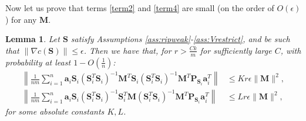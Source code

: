 \documentclass[twoside,11pt]{article}
\newtheorem{lem}{Lemma}
\begin{document}
Now let us prove that terms  \ref{term2} and  \ref{term4} are small (on the order of $O(\epsilon)$) for any $\bm{M}$.

\begin{lem}
	\label{lem:term_24_bound}
	Let $\bm{S}$ satisfy Assumptions \ref{ass:ripweak}-\ref{ass:Vrestrict}, and be such that $\|\nabla c(\bm{S})\|\leq \epsilon$. Then we have that, for $r>\frac{Ck}{m}$ for sufficiently large $C$, with probability at least $1-O(\frac{1}{n})$:
	\begin{align*}
	\left\|\frac{1}{nm}\sum_{i=1}^n\bm{a}_i\bm{S}_i(\bm{S}_i^T\bm{S}_i)^{-1}\bm{M}^T\bm{S}_i(\bm{S}_i^T\bm{S}_i)^{-1}\bm{M}^T\bm{P}_{\bm{S}_i}\bm{a}_i^T\right\|&\leq Kr\epsilon\|\bm{M}\|^2,\\
	\left\|\frac{1}{nm}\sum_{i=1}^n\bm{a}_i\bm{S}_i(\bm{S}_i^T\bm{S}_i)^{-1} \bm{S}^T_i\bm{M}(\bm{S}_i^T\bm{S}_i)^{-1}\bm{M}^T \bm{P}_{\bm{S}_i}\bm{a}_i^T\right\|&\leq Lr\epsilon\|\bm{M}\|^2 ,
	\end{align*}
	for some absolute constants $K,L$. 
\end{lem}
\end{document}
